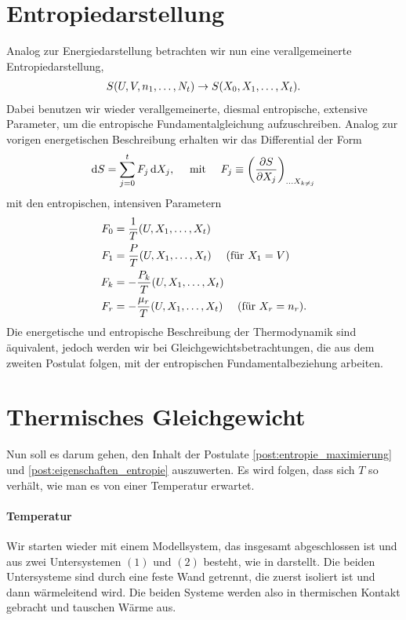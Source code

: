 \section{Entropiedarstellung}
Analog zur Energiedarstellung betrachten wir nun eine verallgemeinerte Entropiedarstellung,
\begin{align*}
    S(U,V,n_1,\ldots,N_t) \rightarrow S(X_0,X_1,\ldots,X_t).
\end{align*}
Dabei benutzen wir wieder verallgemeinerte, diesmal entropische, extensive Parameter, um die entropische Fundamentalgleichung aufzuschreiben. Analog zur vorigen energetischen Beschreibung erhalten wir das Differential der Form
\begin{align*}
    \mathop{}\!\mathrm{d} S = \sum_{j=0}^tF_j\mathop{}\!\mathrm{d} X_j ,\quad\text{ mit } \quad F_j\equiv\left( \frac{\partial S}{\partial X_j} \right)_{\ldots X_{k\neq j}}
\end{align*}
mit den entropischen, intensiven Parametern
\begin{align*}
    F_0 & =\frac{1}{T}(U,X_1,\ldots,X_t)                                    \\
    F_1 & =\frac{P}{T}(U,X_1,\ldots,X_t) \quad\text{ (für $X_1=V$)}         \\
    F_k & =-\frac{P_k}{T}(U,X_1,\ldots,X_t)                                 \\
    F_r & =-\frac{\mu_r}{T}(U,X_1,\ldots,X_t) \quad\text{ (für $X_r=n_r$)}.
\end{align*}
Die energetische und entropische Beschreibung der Thermodynamik sind äquivalent, jedoch werden wir bei Gleichgewichtsbetrachtungen, die aus dem zweiten Postulat folgen, mit der entropischen Fundamentalbeziehung arbeiten.

\section{Thermisches Gleichgewicht\label{sec:thermisches_gleichgewicht}}

Nun soll es darum gehen, den Inhalt der Postulate \ref{post:entropie_maximierung} und \ref{post:eigenschaften_entropie} auszuwerten.
Es wird folgen, dass sich $T$ so verhält, wie man es von einer Temperatur erwartet.

\paragraph*{Temperatur}

Wir starten wieder mit einem Modellsystem, das insgesamt abgeschlossen ist und aus zwei Untersystemen $(1)$ und $(2)$ besteht, wie in  darstellt.
Die beiden Untersysteme sind durch eine feste Wand getrennt, die zuerst isoliert ist und dann wärmeleitend wird. Die beiden Systeme werden also in thermischen Kontakt gebracht und tauschen Wärme aus.

